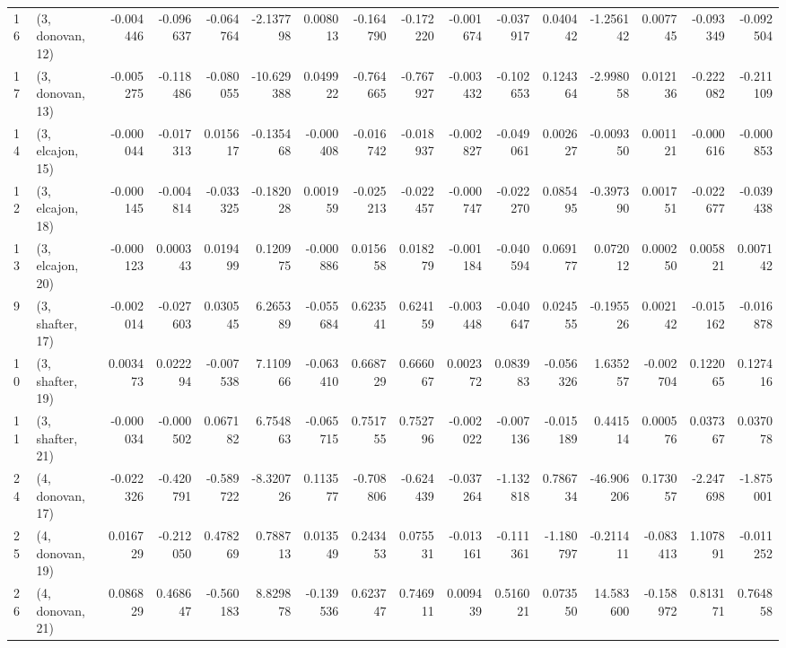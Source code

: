\begin{tabular}{llrrrrrrrrrrrrrr}
16 &  (3, donovan, 12) &  -0.004446 & -0.096637 & -0.064764 &  -2.137798 &  0.008013 &  -0.164790 & -0.172220 & -0.001674 & -0.037917 &  0.040442 &  -1.256142 &  0.007745 & -0.093349 & -0.092504 \\
17 &  (3, donovan, 13) &  -0.005275 & -0.118486 & -0.080055 & -10.629388 &  0.049922 &  -0.764665 & -0.767927 & -0.003432 & -0.102653 &  0.124364 &  -2.998058 &  0.012136 & -0.222082 & -0.211109 \\
14 &  (3, elcajon, 15) &  -0.000044 & -0.017313 &  0.015617 &  -0.135468 & -0.000408 &  -0.016742 & -0.018937 & -0.002827 & -0.049061 &  0.002627 &  -0.009350 &  0.001121 & -0.000616 & -0.000853 \\
12 &  (3, elcajon, 18) &  -0.000145 & -0.004814 & -0.033325 &  -0.182028 &  0.001959 &  -0.025213 & -0.022457 & -0.000747 & -0.022270 &  0.085495 &  -0.397390 &  0.001751 & -0.022677 & -0.039438 \\
13 &  (3, elcajon, 20) &  -0.000123 &  0.000343 &  0.019499 &   0.120975 & -0.000886 &   0.015658 &  0.018279 & -0.001184 & -0.040594 &  0.069177 &   0.072012 &  0.000250 &  0.005821 &  0.007142 \\
9  &  (3, shafter, 17) &  -0.002014 & -0.027603 &  0.030545 &   6.265389 & -0.055684 &   0.623541 &  0.624159 & -0.003448 & -0.040647 &  0.024555 &  -0.195526 &  0.002142 & -0.015162 & -0.016878 \\
10 &  (3, shafter, 19) &   0.003473 &  0.022294 & -0.007538 &   7.110966 & -0.063410 &   0.668729 &  0.666067 &  0.002372 &  0.083983 & -0.056326 &   1.635257 & -0.002704 &  0.122065 &  0.127416 \\
11 &  (3, shafter, 21) &  -0.000034 & -0.000502 &  0.067182 &   6.754863 & -0.065715 &   0.751755 &  0.752796 & -0.002022 & -0.007136 & -0.015189 &   0.441514 &  0.000576 &  0.037367 &  0.037078 \\
24 &  (4, donovan, 17) &  -0.022326 & -0.420791 & -0.589722 &  -8.320726 &  0.113577 &  -0.708806 & -0.624439 & -0.037264 & -1.132818 &  0.786734 & -46.906206 &  0.173057 & -2.247698 & -1.875001 \\
25 &  (4, donovan, 19) &   0.016729 & -0.212050 &  0.478269 &   0.788713 &  0.013549 &   0.243453 &  0.075531 & -0.013161 & -0.111361 & -1.180797 &  -0.211411 & -0.083413 &  1.107891 & -0.011252 \\
26 &  (4, donovan, 21) &   0.086829 &  0.468647 & -0.560183 &   8.829878 & -0.139536 &   0.623747 &  0.746911 &  0.009439 &  0.516021 &  0.073550 &  14.583600 & -0.158972 &  0.813171 &  0.764858 \\

\end{tabular}
